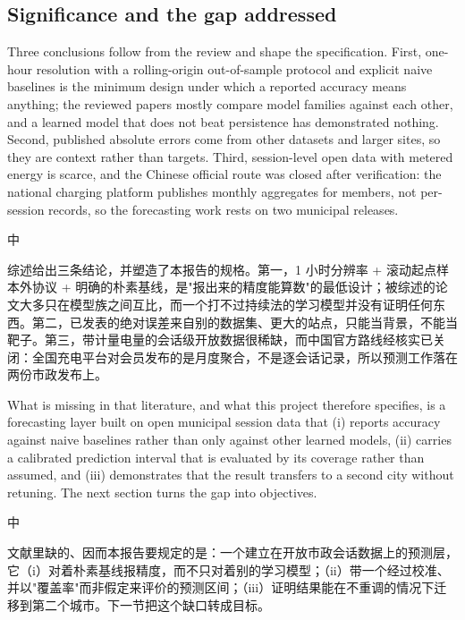 \documentclass[10pt,a4paper]{article}
\newenvironment{zh}{%
  \par\vspace{1pt}%
  \begingroup
  \color{black!72}\small
  \setlength{\parskip}{0pt}%
  \noindent\textsf{\footnotesize 中}\hspace{3pt}\ignorespaces
}{%
  \par\endgroup\vspace{4pt}%
}
\begin{document}
\subsection{Significance and the gap addressed}

Three conclusions follow from the review and shape the specification. First, one-hour resolution
with a rolling-origin out-of-sample protocol and explicit naive baselines is the minimum design
under which a reported accuracy means anything; the reviewed papers mostly compare model families
against each other, and a learned model that does not beat persistence has demonstrated nothing.
Second, published absolute errors come from other datasets and larger sites, so they are context
rather than targets. Third, session-level open data with metered energy is scarce, and the Chinese
official route was closed after verification: the national charging platform publishes monthly
aggregates for members, not per-session records, so the forecasting work rests on two municipal
releases.

\begin{zh}
综述给出三条结论，并塑造了本报告的规格。第一，1 小时分辨率 + 滚动起点样本外协议 + 明确的朴素基线，是"报出来的精度能算数"的最低设计；被综述的论文大多只在模型族之间互比，而一个打不过持续法的学习模型并没有证明任何东西。第二，已发表的绝对误差来自别的数据集、更大的站点，只能当背景，不能当靶子。第三，带计量电量的会话级开放数据很稀缺，而中国官方路线经核实已关闭：全国充电平台对会员发布的是月度聚合，不是逐会话记录，所以预测工作落在两份市政发布上。
\end{zh}

What is missing in that literature, and what this project therefore specifies, is a forecasting
layer built on open municipal session data that (i) reports accuracy against naive baselines
rather than only against other learned models, (ii) carries a calibrated prediction interval that
is evaluated by its coverage rather than assumed, and (iii) demonstrates that the result transfers
to a second city without retuning. The next section turns the gap into objectives.

\begin{zh}
文献里缺的、因而本报告要规定的是：一个建立在开放市政会话数据上的预测层，它（i）对着朴素基线报精度，而不只对着别的学习模型；（ii）带一个经过校准、并以"覆盖率"而非假定来评价的预测区间；（iii）证明结果能在不重调的情况下迁移到第二个城市。下一节把这个缺口转成目标。
\end{zh}

\end{document}
